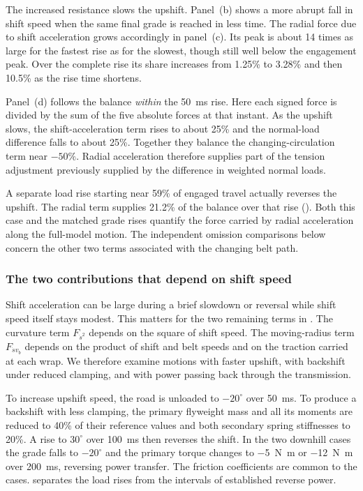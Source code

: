 \documentclass[11pt]{report}
\numberwithin{equation}{section}
\begin{document}
The increased resistance slows the upshift. Panel~(b) shows a more abrupt fall in shift speed when the
same final grade is reached in less time. The radial force due to shift
acceleration grows accordingly in panel~(c). Its peak is
about 14 times as large for the fastest rise as for the slowest, though
still well below the engagement peak. Over the complete rise its share
increases from 1.25\% to 3.28\% and then 10.5\% as the rise time
shortens.

Panel~(d) follows the balance \emph{within} the \SI{50}{ms} rise. Here
each signed force is divided by the sum of the five absolute forces at
that instant. As the upshift slows, the shift-acceleration term rises
to about 25\% and the normal-load difference falls to about 25\%.
Together they balance the changing-circulation term near \(-50\%\).
Radial acceleration therefore supplies part of the tension adjustment
previously supplied by the difference in weighted normal loads.

A separate load rise starting near 59\% of engaged travel actually
reverses the upshift. The radial term supplies 21.2\% of the balance
over that rise (). Both this
case and the matched grade rises quantify the force carried by radial
acceleration along the full-model motion. The independent omission
comparisons below concern the other two terms associated with the
changing belt path.

\subsubsection{The two contributions that depend on shift speed}
\label{sec:results_belt_velocity_terms}

Shift acceleration can be large during a brief slowdown or reversal
while shift speed itself stays modest. This matters for the two
remaining terms in . The curvature term
\(F_{\dot s^2}\) depends on the square of shift speed. The moving-radius
term \(F_{\dot s v_b}\) depends on the product of shift and belt speeds
and on the traction carried at each wrap. We therefore examine motions
with faster upshift, with backshift under reduced clamping, and with
power passing back through the transmission.

To increase upshift speed, the road is unloaded to \(-20^\circ\) over
\SI{50}{ms}. To produce a backshift with less clamping, the primary
flyweight mass and all its moments are reduced to 40\% of their reference
values and both secondary spring stiffnesses to 20\%. A rise to
\(30^\circ\) over \SI{100}{ms} then reverses the shift. In the two
downhill cases the grade falls to \(-20^\circ\) and the primary torque
changes to \SI{-5}{N.m} or \SI{-12}{N.m} over \SI{200}{ms}, reversing
power transfer. The friction coefficients are common to the cases.
 separates the load rises from the
intervals of established reverse power.
\end{document}
